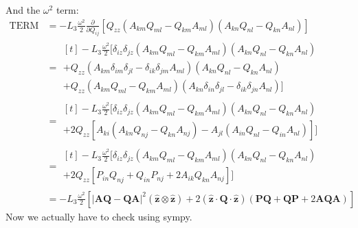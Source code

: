 \documentclass[reqno]{article}
\newcommand{\Q}{\mathbf{Q}}
\newcommand{\bP}{\mathbf{P}}
\newcommand{\A}{\mathbf{A}}
\newcommand{\z}{\mathbf{\hat{z}}}
\begin{document}
And the $\omega^2$ term:
\begin{equation}
\begin{split}
    \text{TERM}
    &=
    -L_3 \frac{\omega^2}{2} \frac{\partial}{\partial Q_{ij}} \left[
        Q_{zz} 
        \left( A_{km} Q_{ml} - Q_{km} A_{ml} \right)
        \left( A_{kn} Q_{nl} - Q_{kn} A_{nl} \right)
    \right] \\
    &=
    \begin{multlined}[t]
    -L_3 \frac{\omega^2}{2} \bigl[
        \delta_{iz} \delta_{jz}
        \left( A_{km} Q_{ml} - Q_{km} A_{ml} \right)
        \left( A_{kn} Q_{nl} - Q_{kn} A_{nl} \right) \\
        +
        Q_{zz} \left(
            A_{km} \delta_{im} \delta_{jl}
            - \delta_{ik} \delta_{jm} A_{ml}
        \right)
        \left( A_{kn} Q_{nl} - Q_{kn} A_{nl} \right) \\
        +
        Q_{zz} 
        \left( A_{km} Q_{ml} - Q_{km} A_{ml} \right)
        \left(
            A_{kn} \delta_{in} \delta_{jl}
            - \delta_{ik} \delta_{jn} A_{nl}
        \right)
    \bigr]
    \end{multlined} \\
    &=
    \begin{multlined}[t]
    -L_3 \frac{\omega^2}{2} \biggl[
        \delta_{iz} \delta_{jz}
        \left( A_{km} Q_{ml} - Q_{km} A_{ml} \right)
        \left( A_{kn} Q_{nl} - Q_{kn} A_{nl} \right) \\
        +
        2 Q_{zz} \left[
            A_{ki} \left( A_{kn} Q_{nj} - Q_{kn} A_{nj} \right)
            - A_{jl}\left( A_{in} Q_{nl} - Q_{in} A_{nl} \right)
        \right] 
    \biggr]
    \end{multlined} \\
    &=
    \begin{multlined}[t]
    -L_3 \frac{\omega^2}{2} \biggl[
        \delta_{iz} \delta_{jz}
        \left( A_{km} Q_{ml} - Q_{km} A_{ml} \right)
        \left( A_{kn} Q_{nl} - Q_{kn} A_{nl} \right) \\
        +
        2 Q_{zz} \left[
            P_{in} Q_{nj} + Q_{in} P_{nj} + 2 A_{ik}Q_{kn} A_{nj}
        \right] 
    \biggr]
    \end{multlined} \\
    &=
    -L_3 \frac{\omega^2}{2} \left[
        \left| \A \Q - \Q \A \right|^2 \left( \z \otimes \z \right)
        +
        2 \left( \z \cdot \Q \cdot \z \right) \left(
            \bP \Q + \Q \bP + 2 \A \Q \A
        \right)
    \right]
\end{split}
\end{equation}
Now we actually have to check using sympy.
\end{document}
